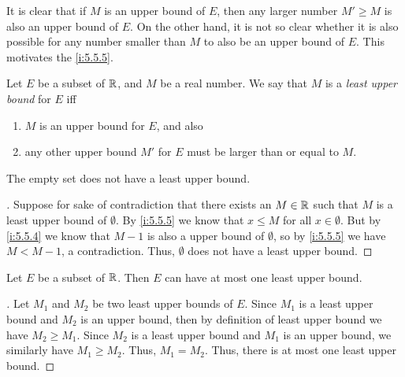 \begin{note}
  It is clear that if \(M\) is an upper bound of \(E\), then any larger number \(M' \geq M\) is also an upper bound of \(E\).
  On the other hand, it is not so clear whether it is also possible for any number smaller than \(M\) to also be an upper bound of \(E\).
  This motivates the \cref{i:5.5.5}.
\end{note}

\begin{defn}\label{i:5.5.5}
  Let \(E\) be a subset of \(\mathbb{R}\), and \(M\) be a real number.
  We say that \(M\) is a \emph{least upper bound} for \(E\) iff
  \begin{enumerate}
    \item \(M\) is an upper bound for \(E\), and also
    \item any other upper bound \(M'\) for \(E\) must be larger than or equal to \(M\).
  \end{enumerate}
\end{defn}

\setcounter{thm}{6}
\begin{eg}\label{i:5.5.7}
  The empty set does not have a least upper bound.
\end{eg}

\begin{proof}[]
  Suppose for sake of contradiction that there exists an \(M \in \mathbb{R}\) such that \(M\) is a least upper bound of \(\emptyset\).
  By \cref{i:5.5.5} we know that \(x \leq M\) for all \(x \in \emptyset\).
  But by \cref{i:5.5.4} we know that \(M - 1\) is also a upper bound of \(\emptyset\), so by \cref{i:5.5.5} we have \(M < M - 1\), a contradiction.
  Thus, \(\emptyset\) does not have a least upper bound.
\end{proof}

\begin{prop}\label{i:5.5.8}
  Let \(E\) be a subset of \(\mathbb{R}\).
  Then \(E\) can have at most one least upper bound.
\end{prop}

\begin{proof}[]
  Let \(M_1\) and \(M_2\) be two least upper bounds of \(E\).
  Since \(M_1\) is a least upper bound and \(M_2\) is an upper bound, then by definition of least upper bound we have \(M_2 \geq M_1\).
  Since \(M_2\) is a least upper bound and \(M_1\) is an upper bound, we similarly have \(M_1 \geq M_2\).
  Thus, \(M_1 = M_2\).
  Thus, there is at most one least upper bound.
\end{proof}

